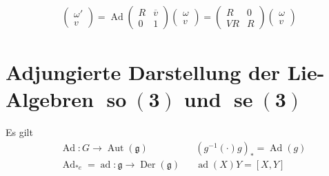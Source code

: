 \documentclass[paper=A4, twoside, chapterprefix=true, bibliography=totoc, headsepline]{scrbook}
\DeclareMathOperator{\ad}{ad}
\DeclareMathOperator{\se}{se}
\DeclareMathOperator{\so}{so}
\DeclareMathOperator{\Ad}{Ad}
\DeclareMathOperator{\Aut}{Aut} %
\DeclareMathOperator{\Der}{Der}
\theoremstyle{nonumberbreak}
\theoremstyle{emptybreak}
\theoremstyle{break}
\begin{document}
\begin{align*}
	\begin{pmatrix}
		\omega' \\ v
	\end{pmatrix}
	=
	\Ad
	\left(\begin{array}{c|c}
		R & \overline v \\ \hline
		0 & 1
	\end{array}\right)
	\begin{pmatrix}
		\omega \\ v
	\end{pmatrix}
	=
	\begin{pmatrix}
		R & 0 \\
		V R & R
	\end{pmatrix}
	\begin{pmatrix}
		\omega \\ v
	\end{pmatrix}
\end{align*}


\section*{Adjungierte Darstellung der Lie-Algebren $\bm{\so(3)}$ und $\bm{\se(3)}$}

Es gilt
\begin{align*}
	&\Ad: G \to \Aut(\mathfrak g) && (g^{-1} (\cdot) g)_{*} = \Ad(g) \\
	&\Ad_{*e} = \ad: \mathfrak g \to \Der(\mathfrak g) && \ad(X)Y = [X, Y]
\end{align*}
\end{document}
